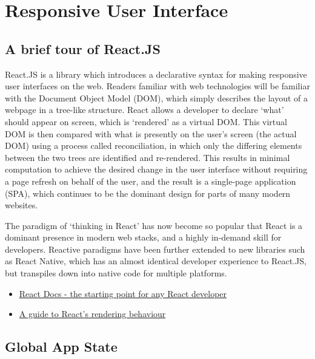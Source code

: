 \section{Responsive User Interface}
\subsection{A brief tour of React.JS}
React.JS is a library which introduces a declarative syntax for making responsive user interfaces on the web. Readers familiar with web technologies will be familiar with the Document Object Model (DOM), which simply describes the layout of a webpage in a tree-like structure. React allows a developer to declare `what' should appear on screen, which is `rendered' as a virtual DOM. This virtual DOM is then compared with what is presently on the user's screen (the actual DOM) using a process called reconciliation, in which only the differing elements between the two trees are identified and re-rendered. This results in minimal computation to achieve the desired change in the user interface without requiring a page refresh on behalf of the user, and the result is a single-page application (SPA), which continues to be the dominant design for parts of many modern websites.

The paradigm of `thinking in React' has now become so popular that React is a dominant presence in modern web stacks, and a highly in-demand skill for developers. Reactive paradigms have been further extended to new libraries such as React Native, which has an almost identical developer experience to React.JS, but transpiles down into native code for multiple platforms.

\begin{itemize}
    \item \href{https://reactjs.org/docs/hello-world.html}{React Docs - the starting point for any React developer}
    \item \href{https://blog.isquaredsoftware.com/2020/05/blogged-answers-a-mostly-complete-guide-to-react-rendering-behavior/#rendering-process-overview}{A guide to React's rendering behaviour}
\end{itemize}

\subsection{Global App State}
